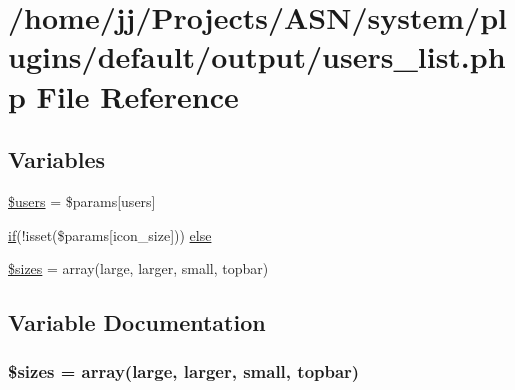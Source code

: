 \hypertarget{system_2plugins_2default_2output_2users__list_8php}{}\section{/home/jj/\+Projects/\+A\+S\+N/system/plugins/default/output/users\+\_\+list.php File Reference}
\label{system_2plugins_2default_2output_2users__list_8php}
\subsection*{Variables}
\begin{DoxyCompactItemize}
\item 
\hyperlink{system_2plugins_2default_2output_2users__list_8php_a28005d22fa7ef2dfe215ad886b497d9c}{\$users} = \$params\mbox{[}\textquotesingle{}users\textquotesingle{}\mbox{]}
\item 
\hyperlink{jquery_8tokeninput_8js_ad8dd46a3cbc004569e34401e9e71771a}{if}(!isset(\$params\mbox{[}\textquotesingle{}icon\+\_\+size\textquotesingle{}\mbox{]})) \hyperlink{system_2plugins_2default_2output_2users__list_8php_a84bc790677077b8d19ffccf3db9f832c}{else}
\item 
\hyperlink{system_2plugins_2default_2output_2users__list_8php_a88f8893f563414e13269ca3219d6ebbc}{\$sizes} = array(\textquotesingle{}large\textquotesingle{}, \textquotesingle{}larger\textquotesingle{}, \textquotesingle{}small\textquotesingle{}, \textquotesingle{}topbar\textquotesingle{})
\end{DoxyCompactItemize}


\subsection{Variable Documentation}
\subsubsection[{\texorpdfstring{\$sizes}{$sizes}}]{\setlength{\rightskip}{0pt plus 5cm}\$sizes = array(\textquotesingle{}large\textquotesingle{}, \textquotesingle{}larger\textquotesingle{}, \textquotesingle{}small\textquotesingle{}, \textquotesingle{}topbar\textquotesingle{})}\hypertarget{system_2plugins_2default_2output_2users__list_8php_a88f8893f563414e13269ca3219d6ebbc}{}\label{system_2plugins_2default_2output_2users__list_8php_a88f8893f563414e13269ca3219d6ebbc}


